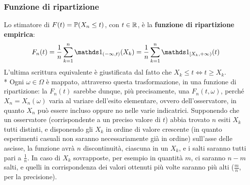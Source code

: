 \subsubsection{Funzione di ripartizione}
Lo stimatore di $F(t) = \mathbb P(X_n \leq t)$, con $t \in \mathbb R$, è la \textbf{funzione di ripartizione empirica}:
$$F_n(t) = \frac 1 n \sum_{k=1}^n \Ind_{(-\infty,t)}(X_k) = \frac 1 n \sum_{k=1}^n \Ind_{[X_k,+\infty)}(t)$$
L'ultima scrittura equivalente è giustificata dal fatto che $X_k \leq t \iff t \geq X_k$. \\*
Ogni $\omega \in \Omega$ è mappato, attraverso questa trasformazione, in una funzione di ripartizione: la $F_n(t)$ sarebbe dunque, più precisamente, una $F_n(t,\omega)$, perché $X_n = X_n(\omega)$ varia al variare dell'esito elementare, ovvero dell'osservatore, in quanto $X_n$ può essere incluso oppure no nelle varie indicatrici.
Supponendo che un osservatore (corrispondente a un preciso valore di $t$) abbia trovato $n$ esiti $X_k$ tutti distinti, e disponendo gli $X_k$ in ordine di valore crescente (in quanto esperimenti casuali non saranno necessariamente già in ordine) sull'asse delle ascisse, la funzione avrà $n$ discontinuità, ciascuna in un $X_k$, e i salti saranno tutti pari a $\frac 1 n$.
In caso di $X_k$ sovrapposte, per esempio in quantità $m$, ci saranno $n-m$ salti, e quelli in corrispondenza dei valori ottenuti più volte saranno più alti ($\frac m n$, per la precisione).

